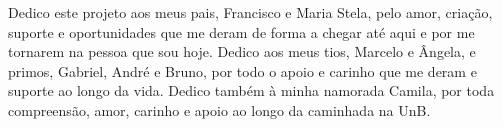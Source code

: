 Dedico este projeto aos meus pais, Francisco e Maria Stela, pelo amor, criação, suporte e oportunidades que me deram de forma a chegar até aqui e por me tornarem na pessoa que sou hoje. Dedico aos meus tios, Marcelo e Ângela, e primos, Gabriel, André e Bruno, por todo o apoio e carinho que me deram e suporte ao longo da vida. Dedico também à minha namorada Camila, por toda compreensão, amor, carinho e apoio ao longo da caminhada na UnB.